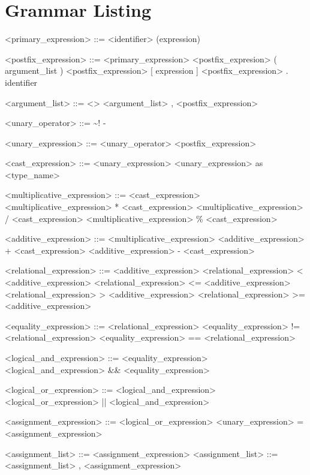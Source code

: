 \section{Grammar Listing}

\begin{grammar}
<primary_expression> ::= <identifier> 
	\alt <float-constant> 
	\alt (expression)

<postfix_expression> ::= <primary_expression> 
	\alt <postfix_expresion> ( argument_list )
	\alt <postfix_expression> [ expression ]
	\alt <postfix_expression> . identifier

<argument_list> ::= <>
	\alt <argument_list> , <postfix_expression>

<unary_operator> ::= \~
	\alt !
	\alt -
	\alt *

<unary_expression> ::= <unary_operator> <postfix_expression>

<cast_expression> ::= <unary_expression>
	\alt <unary_expression> as <type_name>

<multiplicative_expression> ::= <cast_expression>
	\alt <multiplicative_expression> * <cast_expression>
	\alt <multiplicative_expression> / <cast_expression>
	\alt <multiplicative_expression> \% <cast_expression>

<additive_expression> ::= <multiplicative_expression>
	\alt <additive_expression> + <cast_expression>
	\alt <additive_expression> - <cast_expression>

<relational_expression> ::= <additive_expression>
	\alt <relational_expression> \textless{} <additive_expression>
	\alt <relational_expression> \textless{}= <additive_expression>
	\alt <relational_expression> \textgreater{} <additive_expression>
	\alt <relational_expression> \textgreater{}= <additive_expression>

<equality_expression> ::= <relational_expression>
	\alt <equality_expression> != <relational_expression>
	\alt <equality_expression> == <relational_expression>

<logical_and_expression> ::= <equality_expression>
	\alt <logical_and_expression> \&\& <equality_expression>

<logical_or_expression> ::= <logical_and_expression>
	\alt <logical_or_expression> || <logical_and_expression>

<assignment_expression> ::= <logical_or_expression>
	\alt <unary_expression> = <assignment_expression>

<assignment_list> ::= <assignment_expression>
	\alt <assignment_list> ::= <assignment_list> , <assignment_expression> 


\end{grammar}
